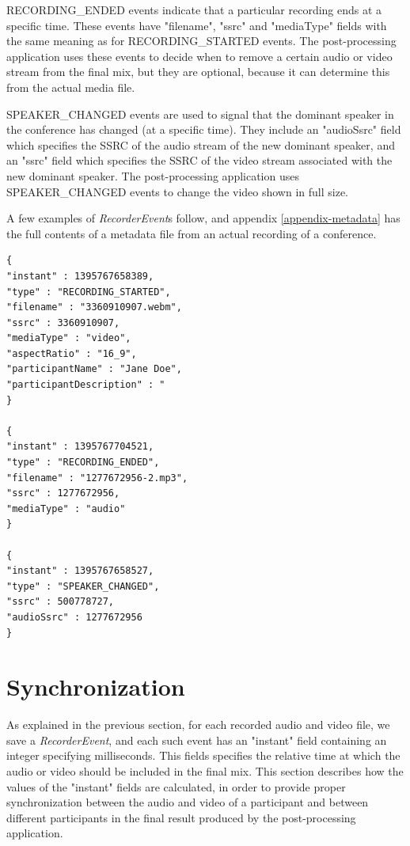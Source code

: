 \documentclass[twoside,openright,a4paper,12pt,english]{article}
\begin{document}
\smallskip
RECORDING\_ENDED events indicate that a particular recording ends at a specific
time. These events have "filename", "ssrc" and "mediaType" fields with the same meaning
as for RECORDING\_STARTED events. The post-processing application uses these
events to decide when to remove a certain audio or video stream from the final mix, but they
are optional, because it can determine this from the actual media file.

\smallskip
SPEAKER\_CHANGED events are used to signal that the dominant speaker in the
conference has changed (at a specific time). They include an "audioSsrc" field which specifies the
SSRC of the audio stream of the new dominant speaker, and an "ssrc" field which specifies the SSRC of the
video stream associated with the new dominant speaker. The post-processing application uses SPEAKER\_CHANGED
events to change the video shown in full size.

A few examples of \emph{RecorderEvent}s follow, and appendix
\ref{appendix-metadata} has the full contents of a metadata file from an
actual recording of a conference.

\begin{verbatim}
{
"instant" : 1395767658389,
"type" : "RECORDING_STARTED",
"filename" : "3360910907.webm",
"ssrc" : 3360910907,
"mediaType" : "video",
"aspectRatio" : "16_9",
"participantName" : "Jane Doe",
"participantDescription" : "
}

{
"instant" : 1395767704521,
"type" : "RECORDING_ENDED",
"filename" : "1277672956-2.mp3",
"ssrc" : 1277672956,
"mediaType" : "audio"
}

{
"instant" : 1395767658527,
"type" : "SPEAKER_CHANGED",
"ssrc" : 500778727,
"audioSsrc" : 1277672956
}
\end{verbatim}

\section{Synchronization}
\label{synchronization}
As explained in the previous section, for each recorded audio and video file,
we save a \emph{RecorderEvent}, and each such event has an "instant" field 
containing an integer specifying milliseconds. This fields specifies the relative time
at which the audio or video should be included in the final mix. This section describes how
the values of the "instant" fields are calculated, in order to provide
proper synchronization between the audio and video of a participant and
between different participants in the final result produced by the post-processing
application.
\end{document}

